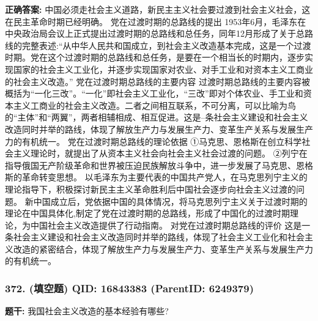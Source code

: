 \documentclass[12pt,UTF8]{ctexart}
\begin{document}
\textbf{正确答案:}
中国必须走社会主义道路，新民主主义社会要过渡到社会主义社会，这在民主革命时期已经明确。
党在过渡时期的总路线的提出
1953年6月，毛泽东在中央政治局会议上正式提出过渡时期的总路线和总任务，同年12月形成了关于总路线的完整表述:“从中华人民共和国成立，到社会主义改造基本完成，这是一个过渡时期。党在这个过渡时期的总路线和总任务，是要在一个相当长的时期内，逐步实现国家的社会主义工业化，并逐步实现国家对农业、对手工业和对资本主义工商业的社会主义改造。”
党在过渡时期总路线的主要内容
过渡时期总路线的主要内容被概括为“一化三改”。“一化”即社会主义工业化，“三改”即对个体农业、手工业和资本主义工商业的社会主义改造。二者之间相互联系，不可分离，可以比喻为鸟的“主体”和“两翼”，两者相辅相成、相互促进。这是--条社会主义建设和社会主义改造同时并举的路线，体现了解放生产力与发展生产力、变革生产关系与发展生产力的有机统一。
党在过渡时期总路线的理论依据
①马克思、恩格斯在创立科学社会主义理论时，就提出了从资本主义社会向社会主义社会过渡的问题。
②列宁在指导俄国无产阶级革命和世界被压迫民族解放斗争中，进一步发展了马克思、恩格斯的革命转变思想。
以毛泽东为主要代表的中国共产党人，在马克思列宁主义的理论指导下，积极探讨新民主主义革命胜利后中国社会逐步向社会主义过渡的问题。
新中国成立后，党依据中国的具体情况，将马克思列宁主义关于过渡时期的理论在中国具体化,制定了党在过渡时期的总路线，形成了中国化的过渡时期理论，为中国社会主义改造提供了行动指南。
对党在过渡时期总路线的评价
这是一条社会主义建设和社会主义改造同时并举的路线，体现了社会主义工业化和社会主义改造的紧密结合，体现了解放生产力与发展生产力、变革生产关系与发展生产力的有机统一。

\vspace{0.3em}\hrulefill\vspace{0.7em}

\subsubsection*{372. (填空题) \small QID: 16843383 (ParentID: 6249379)}

\textbf{题干:}
我国社会主义改造的基本经验有哪些?
\end{document}
